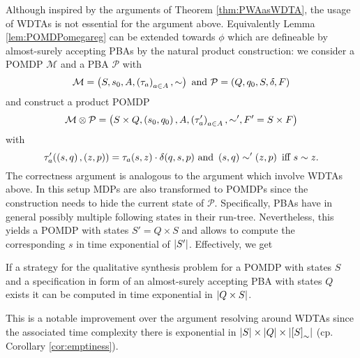 Although inspired by the arguments of Theorem \ref{thm:PWAasWDTA}, the usage 
of \acp{WDTA} is not essential for the argument above. Equivalently Lemma 
\ref{lem:POMDPomegareg} can be extended towards $\phi$ which
are defineable by almost-surely accepting \acp{PBA} by the natural product 
construction: we consider a \ac{POMDP} $\mathcal{M}$ and a \ac{PBA} 
$\mathcal{P}$ with
\begin{equation*}
  \mathcal{M} = \left(S, s_{0}, A, \left(\tau_{a}\right)_{a\in A}, \sim\right)
  \text{ and }
  \mathcal{P} = \left(Q, q_{0}, S, \delta, F\right)
\end{equation*}
and construct a product \ac{POMDP}
\begin{equation*}
  \mathcal{M}\otimes\mathcal{P} = \left(S\times Q, \left(s_{0}, q_{0}\right), A,
    \left(\tau'_{a}\right)_{a\in A}, \sim', F' = S\times F\right)
\end{equation*}
with
\begin{equation*}
  \tau'_{a}(\left(s, q\right), \left(z, p\right)) = \tau_{a}(s, z)\cdot\delta(q, s, p)
  \text{ and }
  \left(s, q\right)\sim'\left(z, p\right)\text{ iff }s\sim z.
\end{equation*}
The correctness argument is analogous to the argument which involve
\acp{WDTA} above. In this setup \acp{MDP} are also transformed to \acp{POMDP}
since the construction needs to hide the current state of $\mathcal{P}$.
Specifically, \acp{PBA} have in general possibly multiple following states in
their run-tree. Nevertheless, this yields a \ac{POMDP} with
states $S' = Q\times S$ and allows to compute the corresponding $s$ in
time exponential of $\left\vert{S'}\right\vert$. Effectively, we get
\begin{corollary}
  If a strategy for the qualitative synthesis problem for a \ac{POMDP} with
  states $S$ and a specification in form of an almost-surely accepting \ac{PBA} 
  with states $Q$ exists it can be computed in time exponential in 
  $\left\vert{Q\times S}\right\vert$.
\end{corollary}
This is a notable improvement over the argument resolving around \acp{WDTA}
since the associated time complexity there is exponential in
$\left\vert{S}\right\vert\times\left\vert{Q}\right\vert\times\left\vert{\left[S\right]_{\sim}}\right\vert$ (cp. Corollary 
\ref{cor:emptiness}).
